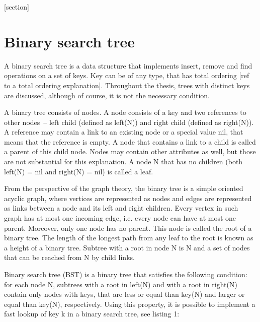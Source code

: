 

[section]
\newcommand{\req}[2]{
\stepcounter{reqcounter}
\indent\par
\textbf{#1\arabic{reqcounter} #2}
}
\newcommand{\funcreq}[1]{\req{F}{#1}}
\newcommand{\nonfreq}[1]{\req{N}{#1}}

\section{Binary search tree}

A binary search tree is a data structure that implements insert, remove and find operations on a set of keys. Key can be of any type, that has total ordering [ref to a total ordering explanation]. Throughout the thesis, trees with distinct keys are discussed, although of course, it is not the necessary condition.

A binary tree consists of nodes. A node consists of a key and two references to other nodes~-- left child (defined as left(N)) and right child (defined as right(N)). A reference may contain a link to an existing node or a special value nil, that means that the reference is empty. A node that contains a link to a child is called a parent of this child node. Nodes may contain other attributes as well, but those are not substantial for this explanation. A node N that has no children (both left(N) = nil and right(N) = nil) is called a leaf.

From the perspective of the graph theory, the binary tree is a simple oriented acyclic graph, where vertices are represented as nodes and edges are represented as links between a node and its left and right children. Every vertex in such graph has at most one incoming edge, i.e. every node can have at most one parent. Moreover, only one node has no parent. This node is called the root of a binary tree. The length of the longest path from any leaf to the root is known as a height of a binary tree. Subtree with a root in node N is N and a set of nodes that can be reached from N by child links.

Binary search tree (BST) is a binary tree that satisfies the following condition: for each node N, subtrees with a root in left(N) and with a root in right(N) contain only nodes with keys, that are less or equal than key(N) and larger or equal than key(N), respectively. Using this property, it is possible to implement a fast lookup of key k in a binary search tree, see listing 1:


